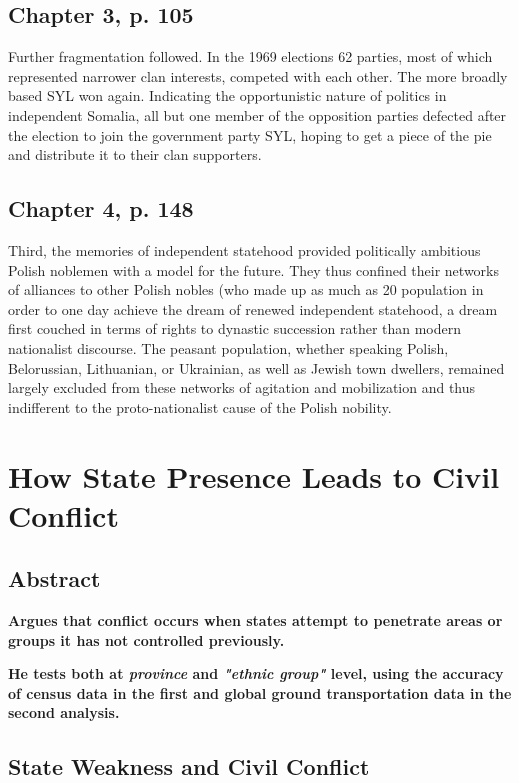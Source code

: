 \documentclass[12pt]{article}
\begin{document}
\subsection{Chapter 3, p. 105}

Further fragmentation followed. In the 1969 elections 62 parties, most of
which represented narrower clan interests, competed with each other. The more
broadly based SYL won again. Indicating the opportunistic nature of politics in
independent Somalia, all but one member of the opposition parties defected after
the election to join the government party SYL, hoping to get a piece of the pie
and distribute it to their clan supporters.

\subsection{Chapter 4, p. 148}

Third, the memories of independent statehood provided politically ambitious
Polish noblemen with a model for the future. They thus confined their networks
of alliances to other Polish nobles (who made up as much as 20%
population in order to one day achieve the dream of renewed independent
statehood, a dream first couched in terms of rights to dynastic succession
rather than modern nationalist discourse. The peasant population, whether
speaking Polish, Belorussian, Lithuanian, or Ukrainian, as well as Jewish town
dwellers, remained largely excluded from these networks of agitation and
mobilization and thus indifferent to the proto-nationalist cause of the Polish
nobility.

\section{How State Presence Leads to Civil Conflict \citep{Ying_2020}}

\subsection{Abstract}

\textbf{Argues that conflict occurs when states attempt to penetrate areas or 
	groups it has not controlled previously.}

\textbf{He tests both at \textit{province} and \textit{"ethnic group"}
level, using the accuracy of census data in the first and global ground
transportation data in the second analysis.}

\subsection{State Weakness and Civil Conflict}
\end{document}
